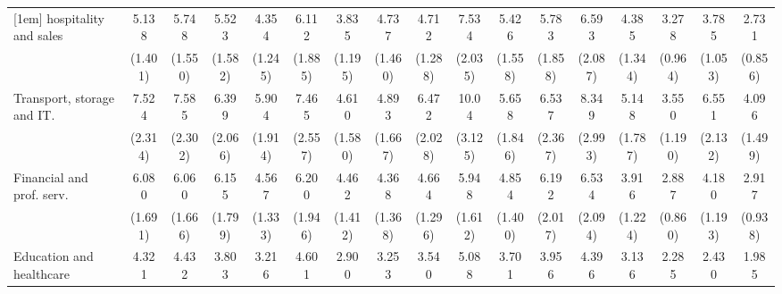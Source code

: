 {\begin{tabular}{l*{16}{c}}
[1em]
hospitality and sales&       5.138\sym{***}&       5.748\sym{***}&       5.523\sym{***}&       4.354\sym{***}&       6.112\sym{***}&       3.835\sym{***}&       4.737\sym{***}&       4.712\sym{***}&       7.534\sym{***}&       5.426\sym{***}&       5.783\sym{***}&       6.593\sym{***}&       4.385\sym{***}&       3.278\sym{***}&       3.785\sym{***}&       2.731\sym{**} \\
                    &     (1.401)         &     (1.550)         &     (1.582)         &     (1.245)         &     (1.885)         &     (1.195)         &     (1.460)         &     (1.288)         &     (2.035)         &     (1.558)         &     (1.858)         &     (2.087)         &     (1.344)         &     (0.964)         &     (1.053)         &     (0.856)         \\
[1em]
Transport, storage and IT.&       7.524\sym{***}&       7.585\sym{***}&       6.399\sym{***}&       5.904\sym{***}&       7.465\sym{***}&       4.610\sym{***}&       4.893\sym{***}&       6.472\sym{***}&       10.04\sym{***}&       5.658\sym{***}&       6.537\sym{***}&       8.349\sym{***}&       5.148\sym{***}&       3.550\sym{***}&       6.551\sym{***}&       4.096\sym{***}\\
                    &     (2.314)         &     (2.302)         &     (2.066)         &     (1.914)         &     (2.557)         &     (1.580)         &     (1.667)         &     (2.028)         &     (3.125)         &     (1.846)         &     (2.367)         &     (2.993)         &     (1.787)         &     (1.190)         &     (2.132)         &     (1.499)         \\
[1em]
Financial and prof. serv.&       6.080\sym{***}&       6.060\sym{***}&       6.155\sym{***}&       4.567\sym{***}&       6.200\sym{***}&       4.462\sym{***}&       4.368\sym{***}&       4.664\sym{***}&       5.948\sym{***}&       4.854\sym{***}&       6.192\sym{***}&       6.534\sym{***}&       3.916\sym{***}&       2.887\sym{***}&       4.180\sym{***}&       2.917\sym{***}\\
                    &     (1.691)         &     (1.666)         &     (1.799)         &     (1.333)         &     (1.946)         &     (1.412)         &     (1.368)         &     (1.296)         &     (1.612)         &     (1.400)         &     (2.017)         &     (2.094)         &     (1.224)         &     (0.860)         &     (1.193)         &     (0.938)         \\
[1em]
Education and healthcare&       4.321\sym{***}&       4.432\sym{***}&       3.803\sym{***}&       3.216\sym{***}&       4.601\sym{***}&       2.900\sym{***}&       3.253\sym{***}&       3.540\sym{***}&       5.088\sym{***}&       3.701\sym{***}&       3.956\sym{***}&       4.396\sym{***}&       3.136\sym{***}&       2.285\sym{**} &       2.430\sym{**} &       1.985\sym{*}  \\

\end{tabular}}
